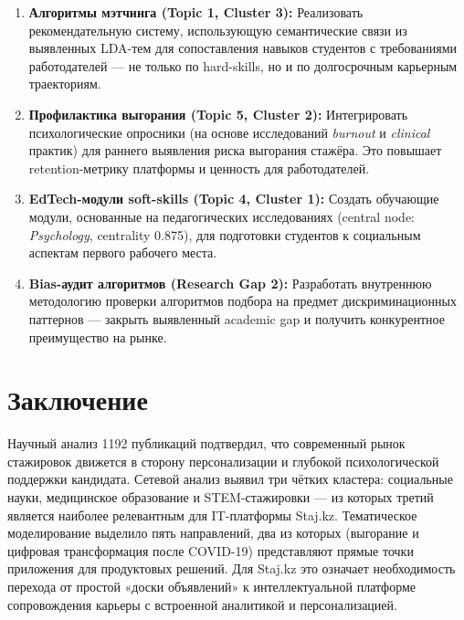 \documentclass[12pt]{article}
\begin{document}
\begin{enumerate}
    \item \textbf{Алгоритмы мэтчинга (Topic 1, Cluster 3):} Реализовать рекомендательную систему, использующую семантические связи из выявленных LDA-тем для сопоставления навыков студентов с требованиями работодателей — не только по hard-skills, но и по долгосрочным карьерным траекториям.

    \item \textbf{Профилактика выгорания (Topic 5, Cluster 2):} Интегрировать психологические опросники (на основе исследований \textit{burnout} и \textit{clinical} практик) для раннего выявления риска выгорания стажёра. Это повышает retention-метрику платформы и ценность для работодателей.

    \item \textbf{EdTech-модули soft-skills (Topic 4, Cluster 1):} Создать обучающие модули, основанные на педагогических исследованиях (central node: \textit{Psychology}, centrality 0.875), для подготовки студентов к социальным аспектам первого рабочего места.

    \item \textbf{Bias-аудит алгоритмов (Research Gap 2):} Разработать внутреннюю методологию проверки алгоритмов подбора на предмет дискриминационных паттернов — закрыть выявленный academic gap и получить конкурентное преимущество на рынке.
\end{enumerate}

\section*{Заключение}
Научный анализ 1192 публикаций подтвердил, что современный рынок стажировок движется в сторону персонализации и глубокой психологической поддержки кандидата. Сетевой анализ выявил три чётких кластера: социальные науки, медицинское образование и STEM-стажировки — из которых третий является наиболее релевантным для IT-платформы Staj.kz. Тематическое моделирование выделило пять направлений, два из которых (выгорание и цифровая трансформация после COVID-19) представляют прямые точки приложения для продуктовых решений. Для Staj.kz это означает необходимость перехода от простой «доски объявлений» к интеллектуальной платформе сопровождения карьеры с встроенной аналитикой и персонализацией.
\end{document}

